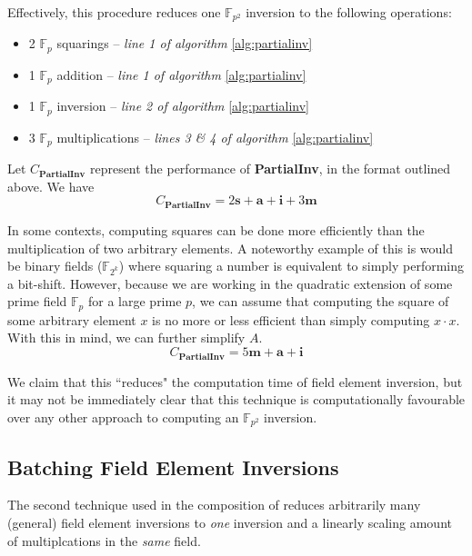 Effectively, this procedure reduces one $\mathbb{F}_{p^{2}}$ inversion to the following operations: 

\begin{center}
\begin{itemize}
\item 2 $\mathbb{F}_{p}$ squarings -- \emph{line 1 of algorithm} \ref{alg:partialinv}
\item 1 $\mathbb{F}_{p}$ addition -- \emph{line 1 of algorithm} \ref{alg:partialinv}
\item 1 $\mathbb{F}_{p}$ inversion -- \emph{line 2 of algorithm} \ref{alg:partialinv}
\item 3 $\mathbb{F}_{p}$ multiplications -- \emph{lines 3 \& 4 of algorithm} \ref{alg:partialinv}
\end{itemize}
\end{center}

Let $C_{\textbf{PartialInv}}$ represent the performance of \textbf{PartialInv}, in the format outlined above. We have
$$
C_{\textbf{PartialInv}} = 2\textbf{s} + \textbf{a} + \textbf{i} + 3\textbf{m}
$$

In some contexts, computing squares can be done more efficiently than the multiplication of two arbitrary elements. A noteworthy example of this is would be binary fields ($\mathbb{F}_{2^k}$) where squaring a number is equivalent to simply performing a bit-shift. However, because we are working in the quadratic extension of some prime field $\mathbb{F}_p$ for a large prime $p$, we can assume that computing the square of some arbitrary element $x$ is no more or less efficient than simply computing $x \cdot x$. With this in mind, we can further simplify $A$.
$$
C_{\textbf{PartialInv}} = 5\textbf{m} + \textbf{a} + \textbf{i}
$$

We claim that this ``reduces" the computation time of field element inversion, but it may not be immediately clear that this technique is computationally favourable over any other approach to computing an $\mathbb{F}_{p^{2}}$ inversion. 

\subsection{Batching Field Element Inversions}
\label{subsec:batching}

The second technique used in the composition of  reduces arbitrarily many (general) field element inversions to \emph{one} inversion and a linearly scaling amount of multiplcations in the \emph{same} field.

